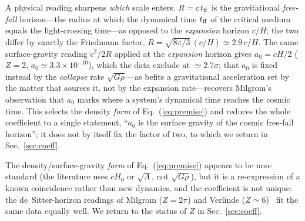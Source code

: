 \documentclass[aps,prd,preprint,nofootinbib,floatfix]{revtex4-2}
\begin{document}
A physical reading sharpens {\it which} scale enters. $R=c\,t_{\rm ff}$ is the
gravitational {\it free-fall} horizon---the radius at which the dynamical time
$t_{\rm ff}$ of the critical medium equals the light-crossing time---as opposed to
the {\it expansion} horizon $c/H$; the two differ by exactly the Friedmann factor,
$R=\sqrt{8\pi/3}\,(c/H)\simeq2.9\,c/H$. The same surface-gravity reading $c^2/2R$
applied at the {\it expansion} horizon gives $a_0=cH/2$ ($Z=2$,
$a_0\simeq3.3\times10^{-10}$), which the data exclude at $\simeq2.7\sigma$; that
$a_0$ is fixed instead by the {\it collapse} rate $\sqrt{G\rho}$---as befits a
gravitational acceleration set by the matter that sources it, not by the expansion
rate---recovers Milgrom's observation that $a_0$ marks where a system's dynamical
time reaches the cosmic time. This selects the density {\it form} of
Eq.~(\ref{eq:premise}) and reduces the whole coefficient to a single statement,
``$a_0$ is the surface gravity of the cosmic free-fall horizon''; it does not by
itself fix the factor of two, to which we return in Sec.~\ref{sec:coeff}.

The density/surface-gravity {\it form} of
Eq.~(\ref{eq:premise}) appears to be non-standard (the literature uses $cH_0$ or
$\sqrt{\Lambda}$, not $\sqrt{G\rho}$), but it is a re-expression of a known
coincidence rather than new dynamics, and the coefficient is not unique: the
de~Sitter-horizon readings of Milgrom ($Z=2\pi$) and Verlinde
($Z\simeq6$)~\cite{Verlinde2017} fit the same data equally well. We return to the
status of $Z$ in Sec.~\ref{sec:coeff}.

\end{document}

